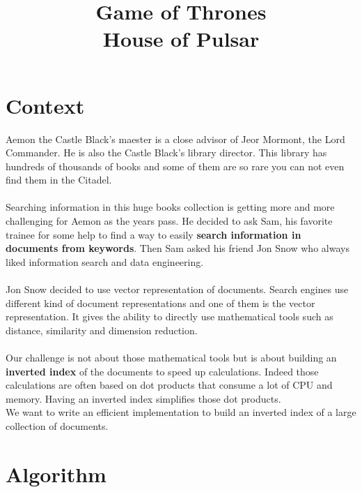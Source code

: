 \documentclass[12pt,french,titlepage]{article}
\title{\textbf{Game of Thrones} \\ House of Pulsar}
\date{\vspace{-35ex}}
\begin{document}
\maketitle

\section{Context}
Aemon the Castle Black's maester is a close advisor of Jeor Mormont, the Lord Commander. He is also the Castle Black's library director. This library has hundreds of thousands of books and some of them are so rare you can not even find them in the Citadel. 
\\\\
Searching information in this huge books collection is getting more and more challenging for Aemon as the years pass. He decided to ask Sam, his favorite trainee for some help to find a way to easily \textbf{search information in documents from keywords}. Then Sam asked his friend Jon Snow who always liked information search and data engineering.
\\\\
Jon Snow decided to use vector representation of documents. Search engines use different kind of document representations and one of them is the vector representation. It gives the ability to directly use mathematical tools such as distance, similarity and dimension reduction.
\\\\
Our challenge is not about those mathematical tools but is about building an \textbf{inverted index} of the documents to speed up calculations. Indeed those calculations are often based on dot products that consume a lot of CPU and memory. Having an inverted index simplifies those dot products.
\\
We want to write an efficient implementation to build an inverted index of a large collection of documents.

\section{Algorithm}
\end{document}
